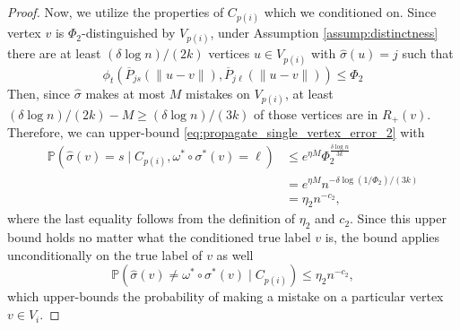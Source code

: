 \documentclass{article}
\renewcommand{\P}{\mathbb{P}}
\newcommand{\1}{\mathbbm{1}}
\theoremstyle{definition}
\theoremstyle{plain}
\begin{document}
\begin{proof}
Now, we utilize the properties of $C_{p(i)}$ which we conditioned on. Since vertex $v$ is $\Phi_2$-distinguished by $V_{p(i)}$, under Assumption \ref{assump:distinctness} there are at least $(\delta \log n)/(2k)$ vertices $u \in V_{p(i)}$ with $\hat{\sigma}(u) = j$ such that 
\begin{equation*}
    \phi_t(\overline{P}_{js}(\|u-v\|), \overline{P}_{j\ell}(\|u-v\|)) \leq \Phi_2
\end{equation*}
Then, since $\hat{\sigma}$ makes at most $M$ mistakes on $V_{p(i)}$, at least $(\delta \log n)/(2k) - M \geq (\delta \log n)/(3k)$ of those vertices are in $R_+(v)$. Therefore, we can upper-bound \eqref{eq:propagate_single_vertex_error_2} with
\begin{align*}
    \P(\hat{\sigma}(v) = s \mid C_{p(i)}, \omega^* \circ \sigma^*(v) = \ell) &\leq e^{\eta M} \Phi_2^{\frac{\delta \log n}{3k}} \\
    &= e^{\eta M} n^{-\delta \log(1 / \Phi_2) / (3k)} \\
    &= \eta_2 n^{-c_2},
\end{align*}
where the last equality follows from the definition of $\eta_2$ and $c_2$. Since this upper bound holds no matter what the conditioned true label $v$ is, the bound applies unconditionally on the true label of $v$ as well
\begin{equation*}
    \P(\hat{\sigma}(v) \neq \omega^* \circ \sigma^*(v) \mid C_{p(i)}) \leq \eta_2 n^{-c_2},
\end{equation*}
which upper-bounds the probability of making a mistake on a particular vertex $v \in V_i$.


\end{proof}
\end{document}
